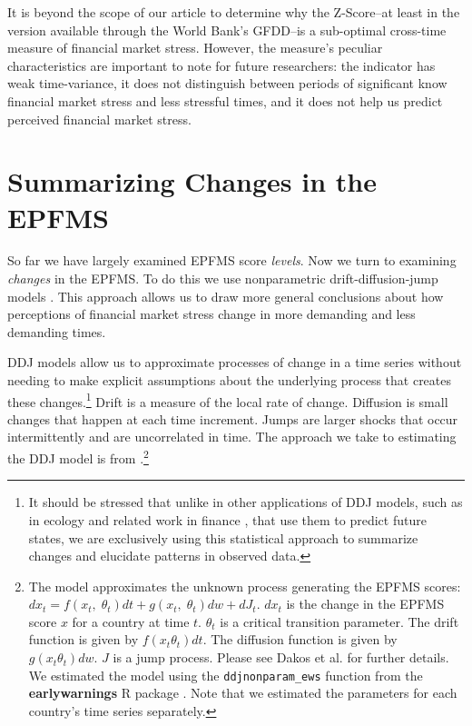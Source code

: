 \documentclass[]{article}
\begin{document}
It is beyond the scope of our article to determine why the Z-Score--at least in the version available through the World Bank's GFDD--is a sub-optimal cross-time measure of financial market stress. However, the measure's peculiar characteristics are important to note for future researchers: the indicator has weak time-variance, it does not distinguish between periods of significant know financial market stress and less stressful times, and it does not help us predict perceived financial market stress.

\section{Summarizing Changes in the EPFMS}

So far we have largely examined EPFMS score \emph{levels}. Now we turn to examining \emph{changes} in the EPFMS. To do this we use nonparametric drift-diffusion-jump models \citep[DDJ,][]{Carpenter2011,Dakos2012}. This approach allows us to draw more general conclusions about how perceptions of financial market stress change in more demanding and less demanding times.

DDJ models allow us to approximate processes of change in a time series without needing to make explicit assumptions about the underlying process that creates these changes.\footnote{It should be stressed that unlike in other applications of DDJ models, such as in ecology and related work in finance \citep{Kou2008}, that use them to predict future states, we are exclusively using this statistical approach to summarize changes and elucidate patterns in observed data.} Drift is a measure of the local rate of change. Diffusion is small changes that happen at each time increment. Jumps are larger shocks that occur intermittently and are uncorrelated in time. The approach we take to estimating the DDJ model is from \cite{Carpenter2011}.\footnote{The model approximates the unknown process generating the EPFMS scores: $dx_{t} = f(x_{t},\;\theta_{t})dt + g(x_{t},\;\theta_{t})dw + dJ_{t}$. $dx_{t}$ is the change in the EPFMS score $x$ for a country at time $t$. $\theta_{t}$ is a critical transition parameter. The drift function is given by $f(x_{t}\theta_{t})dt$. The diffusion function is given by $g(x_{t}\theta_{t})dw$. $J$ is a jump process. Please see Dakos et al. \citeyearpar[7]{Dakos2012} for further details. We estimated the model using the \texttt{ddjnonparam\_ews} function from the \textbf{earlywarnings} R package \citep{earlywarnings2013}. Note that we estimated the parameters for each country's time series separately.}
\end{document}
